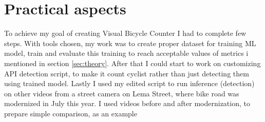 \chapter{Practical aspects}
\label{cha:practicalAspects}

To achieve my goal of creating Visual Bicycle Counter I had to complete few steps. With tools chosen, my work was to create proper dataset for training ML model, train and evaluate this training to reach acceptable values of metrics i mentioned in section \ref{sec:theory}. After that I could start to work on customizing API detection script, to make it count cyclist rather than just detecting them using trained model. Lastly I used my edited script to run inference (detection) on other videos from a street camera on Lema Street, where bike road was modernized in July this year. I used videos before and after modernization, to prepare simple comparison, as an example  